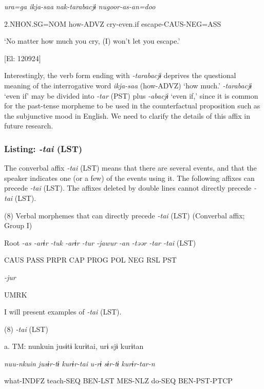      \textit{ura=ga}  \textit{ikja-saa}  \textit{nak-tarabacjɨ}  \textit{nugoor-as-an=doo}

      2.NHON.SG=NOM  how-ADVZ  cry-even.if  escape-CAUS-NEG=ASS

      ‘No matter how much you cry, (I) won’t let you escape.’

      [El: 120924]

Interestingly, the verb form ending with \textit{{}-tarabacjɨ} deprives the questional meaning of the interrogative word \textit{ikja-saa} (how-ADVZ) ‘how much.’ \textit{{}-tarabacjɨ} ‘even if’ may be divided into \textit{{}-tar} (PST) plus \textit{{}-abacjɨ} ‘even if,’ since it is common for the past-tense morpheme to be used in the counterfactual proposition such as the subjunctive mood in English. We need to clarify the details of this affix in future research.

\subsubsection{Listing: \textit{{}-tai} (LST)}

The converbal affix \textit{{}-tai} (LST) means that there are several events, and that the speaker indicates one (or a few) of the events using it. The following affixes can precede \textit{{}-tai} (LST). The affixes deleted by double lines cannot directly precede \textit{{}-tai} (LST).

(8)  Verbal morphemes that can directly precede \textit{{}-tai} (LST) (Converbal affix; Group I)

  Root  \textit{{}-as  {}-arɨr} %
\textit{{}-tuk  {}-arɨr  {}-tur  {}-jawur} %
\textit{{}-an  {}-təər  {}-tar  {}-tai} (LST)

    CAUS  PASS  PRPR  CAP  PROG  POL  NEG  RSL  PST  

          \textit{{}-jur} 

          UMRK    

I will present examples of \textit{{}-tai} (LST).

(8)  \textit{{}-tai} (LST)

  a.  TM:  nunkuin  jusɨtɨ  kurɨtai,  urɨ  sjɨ  kurɨtan

      \textit{nuu-nkuin}  \textit{jusɨr-tɨ}  \textit{kurɨr-tai}  \textit{u-rɨ}  \textit{sɨr-tɨ}  \textit{kurɨr-tar-n}

      what-INDFZ  teach-SEQ  BEN-LST  MES-NLZ  do-SEQ  BEN-PST-PTCP

